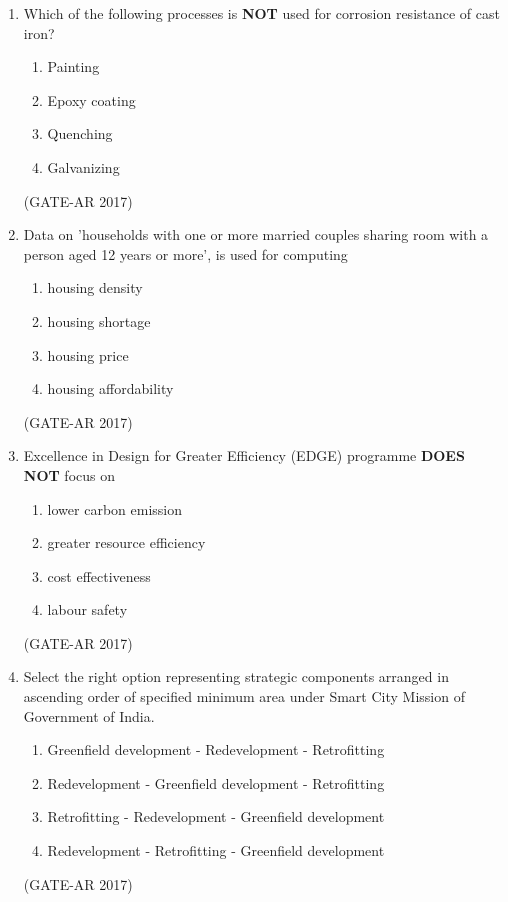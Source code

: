 \documentclass[a4paper,10pt]{article}
\begin{document}
\begin{enumerate}
    \item Which of the following processes is \textbf{NOT} used for corrosion resistance of cast iron? 
    \begin{multicols}{4}
	\begin{enumerate}
        \item Painting
        \item Epoxy coating
        \item Quenching
        \item Galvanizing
    \end{enumerate}
	\end{multicols}
    \hfill (GATE-AR 2017)
    
    \item Data on 'households with one or more married couples sharing room with a person aged 12 years or more', is used for computing 
    \begin{multicols}{2}
	\begin{enumerate}
        \item housing density
        \item housing shortage
        \item housing price
        \item housing affordability
    \end{enumerate}
	\end{multicols}
    \hfill (GATE-AR 2017)
    
    \item Excellence in Design for Greater Efficiency (EDGE) programme \textbf{DOES NOT} focus on 
    \begin{multicols}{2}
	\begin{enumerate}
        \item lower carbon emission
        \item greater resource efficiency
        \item cost effectiveness
        \item labour safety
    \end{enumerate}
	\end{multicols}
    \hfill (GATE-AR 2017)
    
    \item Select the right option representing strategic components arranged in ascending order of specified minimum area under Smart City Mission of Government of India. 
    \begin{enumerate}
        \item Greenfield development - Redevelopment - Retrofitting
        \item Redevelopment - Greenfield development - Retrofitting
        \item Retrofitting - Redevelopment - Greenfield development
        \item Redevelopment - Retrofitting - Greenfield development
    \end{enumerate}
    \hfill (GATE-AR 2017)
    

\end{enumerate}
\end{document}
